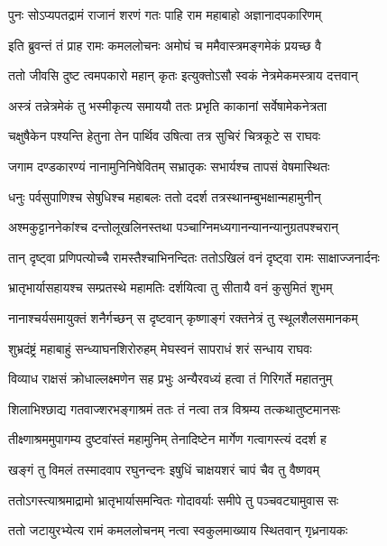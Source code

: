 \twolineshloka
{पुनः सोऽप्यपतद्रामं राजानं शरणं गतः}
{पाहि राम महाबाहो अज्ञानादपकारिणम्} %

\twolineshloka
{इति ब्रुवन्तं तं प्राह रामः कमललोचनः}
{अमोघं च ममैवास्त्रमङ्गमेकं प्रयच्छ वै} %

\twolineshloka
{ततो जीवसि दुष्ट त्वमपकारो महान् कृतः}
{इत्युक्तोऽसौ स्वकं नेत्रमेकमस्त्राय दत्तवान्} %

\twolineshloka
{अस्त्रं तन्नेत्रमेकं तु भस्मीकृत्य समाययौ}
{ततः प्रभृति काकानां सर्वेषामेकनेत्रता} %

\twolineshloka
{चक्षुषैकेन पश्यन्ति हेतुना तेन पार्थिव}
{उषित्वा तत्र सुचिरं चित्रकूटे स राघवः} %

\twolineshloka
{जगाम दण्डकारण्यं नानामुनिनिषेवितम्}
{सभ्रातृकः सभार्यश्च तापसं वेषमास्थितः} %

\twolineshloka
{धनुः पर्वसुपाणिश्च सेषुधिश्च महाबलः}
{ततो ददर्श तत्रस्थानम्बुभक्षान्महामुनीन्} %

\twolineshloka
{अश्मकुट्टाननेकांश्च दन्तोलूखलिनस्तथा}
{पञ्चाग्निमध्यगानन्यानन्यानुग्रतपश्चरान्} %

\twolineshloka
{तान् दृष्ट्वा प्रणिपत्योच्चै रामस्तैश्चाभिनन्दितः}
{ततोऽखिलं वनं दृष्ट्वा रामः साक्षाज्जनार्दनः} %

\twolineshloka
{भ्रातृभार्यासहायश्च सम्प्रतस्थे महामतिः}
{दर्शयित्वा तु सीतायै वनं कुसुमितं शुभम्} %

\twolineshloka
{नानाश्चर्यसमायुक्तं शनैर्गच्छन् स दृष्टवान्}
{कृष्णाङ्गं रक्तनेत्रं तु स्थूलशैलसमानकम्} %

\twolineshloka
{शुभ्रदंष्ट्रं महाबाहुं सन्ध्याघनशिरोरुहम्}
{मेघस्वनं सापराधं शरं सन्धाय राघवः} %

\twolineshloka
{विव्याध राक्षसं क्रोधाल्लक्ष्मणेन सह प्रभुः}
{अन्यैरवध्यं हत्वा तं गिरिगर्ते महातनुम्} %

\twolineshloka
{शिलाभिश्छाद्य गतवाज्शरभङ्गाश्रमं ततः}
{तं नत्वा तत्र विश्रम्य तत्कथातुष्टमानसः} %

\twolineshloka
{तीक्ष्णाश्रममुपागम्य दुष्टवांस्तं महामुनिम्}
{तेनादिष्टेन मार्गेण गत्वागस्त्यं ददर्श ह} %

\twolineshloka
{खङ्गं तु विमलं तस्मादवाप रघुनन्दनः}
{इषुधिं चाक्षयशरं चापं चैव तु वैष्णवम्} %

\twolineshloka
{ततोऽगस्त्याश्रमाद्रामो भ्रातृभार्यासमन्वितः}
{गोदावर्याः समीपे तु पञ्चवट्यामुवास सः} %

\twolineshloka
{ततो जटायुरभ्येत्य रामं कमललोचनम्}
{नत्वा स्वकुलमाख्याय स्थितवान् गृध्रनायकः} %

